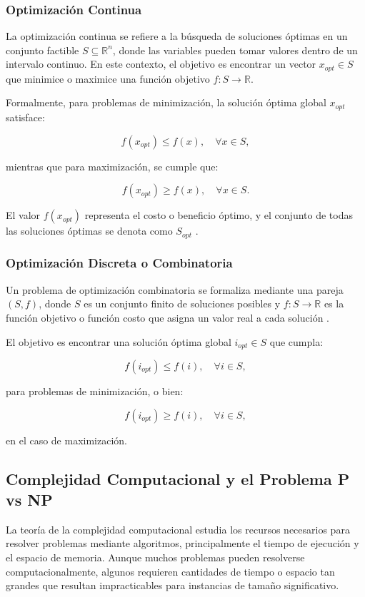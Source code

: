 \documentclass[12pt,titlepage,twoside,openright]{book}
\begin{document}
\subsubsection{Optimización Continua}

La optimización continua se refiere a la búsqueda de soluciones óptimas en un conjunto factible \( S \subseteq \mathbb{R}^n \), donde las variables pueden tomar valores dentro de un intervalo continuo. En este contexto, el objetivo es encontrar un vector \( x_{opt} \in S \) que minimice o maximice una función objetivo \( f: S \to \mathbb{R} \).

Formalmente, para problemas de minimización, la solución óptima global \( x_{opt} \) satisface:

\[
	f(x_{opt}) \leq f(x), \quad \forall x \in S,
\]

mientras que para maximización, se cumple que:

\[
	f(x_{opt}) \geq f(x), \quad \forall x \in S.
\]

El valor \( f(x_{opt}) \) representa el costo o beneficio óptimo, y el conjunto de todas las soluciones óptimas se denota como \( S_{opt} \) \citep{cobos2010}.

\subsubsection{Optimización Discreta o Combinatoria}

Un problema de optimización combinatoria se formaliza mediante una pareja \((S, f)\), donde \(S\) es un conjunto finito de soluciones posibles y \(f: S \to \mathbb{R}\) es la función objetivo o función costo que asigna un valor real a cada solución \citep{cobos2010}.

El objetivo es encontrar una solución óptima global \(i_{opt} \in S\) que cumpla:

\[
	f(i_{opt}) \leq f(i), \quad \forall i \in S,
\]

para problemas de minimización, o bien:

\[
	f(i_{opt}) \geq f(i), \quad \forall i \in S,
\]

en el caso de maximización.

\subsection{Complejidad Computacional y el Problema P vs NP}

La teoría de la complejidad computacional estudia los recursos necesarios para resolver problemas mediante algoritmos, principalmente el tiempo de ejecución y el espacio de memoria. Aunque muchos problemas pueden resolverse computacionalmente, algunos requieren cantidades de tiempo o espacio tan grandes que resultan impracticables para instancias de tamaño significativo.
\end{document}

